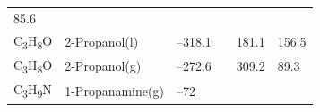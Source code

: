 \documentclass[
]{book}
\theoremstyle{definition}
\theoremstyle{definition}
\theoremstyle{definition}
\theoremstyle{remark}
\begin{document}
\begin{longtable}[]{@{}llllll@{}}
\begin{minipage}[t]{0.14\columnwidth}
85.6\strut
\end{minipage}\tabularnewline
\begin{minipage}[t]{0.07\columnwidth}\raggedright
C\textsubscript{3}H\textsubscript{8}O\strut
\end{minipage} & \begin{minipage}[t]{0.17\columnwidth}\raggedright
2-Propanol(l)\strut
\end{minipage} & \begin{minipage}[t]{0.15\columnwidth}\raggedright
--318.1\strut
\end{minipage} & \begin{minipage}[t]{0.15\columnwidth}\raggedright
\strut
\end{minipage} & \begin{minipage}[t]{0.14\columnwidth}\raggedright
181.1\strut
\end{minipage} & \begin{minipage}[t]{0.14\columnwidth}\raggedright
156.5\strut
\end{minipage}\tabularnewline
\begin{minipage}[t]{0.07\columnwidth}\raggedright
C\textsubscript{3}H\textsubscript{8}O\strut
\end{minipage} & \begin{minipage}[t]{0.17\columnwidth}\raggedright
2-Propanol(g)\strut
\end{minipage} & \begin{minipage}[t]{0.15\columnwidth}\raggedright
--272.6\strut
\end{minipage} & \begin{minipage}[t]{0.15\columnwidth}\raggedright
\strut
\end{minipage} & \begin{minipage}[t]{0.14\columnwidth}\raggedright
309.2\strut
\end{minipage} & \begin{minipage}[t]{0.14\columnwidth}\raggedright
89.3\strut
\end{minipage}\tabularnewline
\begin{minipage}[t]{0.07\columnwidth}\raggedright
C\textsubscript{3}H\textsubscript{9}N\strut
\end{minipage} & \begin{minipage}[t]{0.17\columnwidth}\raggedright
1-Propanamine(g)\strut
\end{minipage} & \begin{minipage}[t]{0.15\columnwidth}\raggedright
--72\strut
\end{minipage} & \begin{minipage}[t]{0.15\columnwidth}\raggedright

\end{minipage}
\end{longtable}
\end{document}
